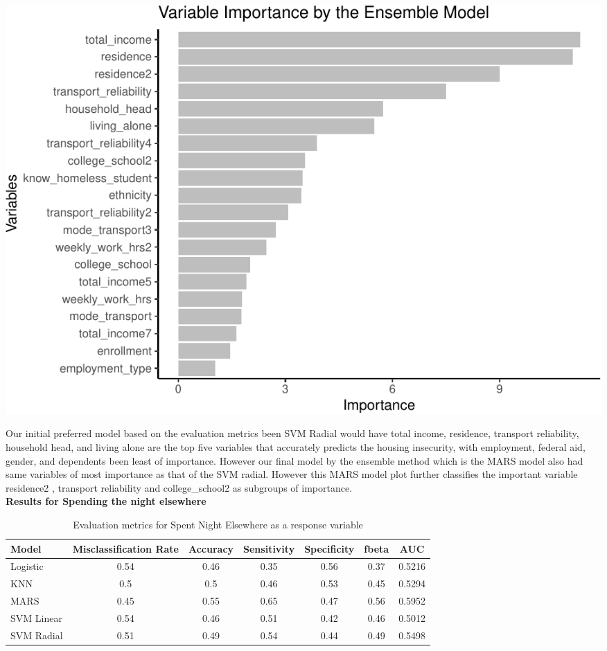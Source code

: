\documentclass[
  10pt,
]{article}
\begin{document}
\begin{center}\includegraphics{final_phase2_report_files/figure-latex/unnamed-chunk-12-1} \end{center}

Our initial preferred model based on the evaluation metrics been SVM Radial would have total income, residence, transport reliability, household head, and living alone are the top five variables that accurately predicts the housing insecurity, with employment, federal aid, gender, and dependents been least of importance. However our final model by the ensemble method which is the MARS model also had same variables of most importance as that of the SVM radial. However this MARS model plot further classifies the important variable residence2 , transport reliability and college\_school2 as subgroups of importance.\\

\textbf{Results for Spending the night elsewhere}

\begin{table}[H]

\caption{\label{tab:unnamed-chunk-13}Evaluation metrics for Spent Night Elsewhere  as a response variable}
\centering
\fontsize{12}{14}\selectfont
\begin{tabular}[t]{lcccccc}
\toprule
Model & Misclassification Rate & Accuracy & Sensitivity & Specificity & fbeta & AUC\\
\midrule
Logistic & 0.54 & 0.46 & 0.35 & 0.56 & 0.37 & 0.5216\\
KNN & 0.5 & 0.5 & 0.46 & 0.53 & 0.45 & 0.5294\\
MARS & 0.45 & 0.55 & 0.65 & 0.47 & 0.56 & 0.5952\\
SVM Linear & 0.54 & 0.46 & 0.51 & 0.42 & 0.46 & 0.5012\\
SVM Radial & 0.51 & 0.49 & 0.54 & 0.44 & 0.49 & 0.5498\\
\bottomrule
\end{tabular}
\end{table}
\end{document}
